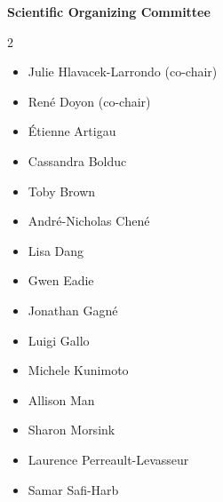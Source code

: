 \bigskip
{\large\bfseries\sffamily Scientific Organizing Committee}
\begin{multicols}{2}
\begin{itemize}
  \item Julie Hlavacek-Larrondo (co-chair)
  \item Ren\'e Doyon (co-chair)
  \item \'Etienne Artigau
  \item Cassandra Bolduc
  \item Toby Brown
  \item Andr\'e-Nicholas Chen\'e
  \item Lisa Dang
  \item Gwen Eadie
  \item Jonathan Gagn\'e
  \item Luigi Gallo
  \item Michele Kunimoto
  \item Allison Man
  \item Sharon Morsink
  \item Laurence Perreault-Levasseur
  \item Samar Safi-Harb
\end{itemize}
\end{multicols}